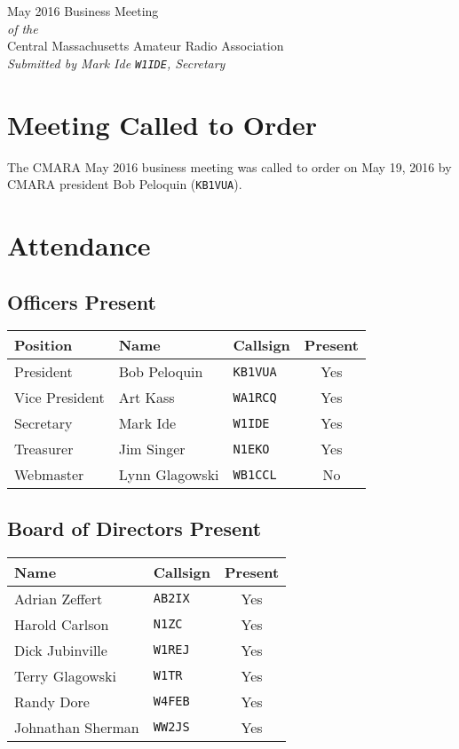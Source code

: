 \documentclass[10pt,letterpaper]{article}
\begin{document}
\begin{center}
{\huge May 2016 Business Meeting}\\
\emph{of the}\\
{\Large Central Massachusetts Amateur Radio Association}\\
\emph{Submitted by Mark Ide \texttt{W1IDE}, Secretary}
\end{center}

\section{Meeting Called to Order}
The CMARA May 2016 business meeting was called to order on May 19, 2016 by CMARA president Bob Peloquin (\texttt{KB1VUA}).

\section{Attendance}

\subsection{Officers Present}

\begin{tabular}{|l|l|l|c|}
  \hline
  \textbf{Position} & \textbf{Name}  & \textbf{Callsign} & \textbf{Present} \\ \hline
  President         & Bob Peloquin   & \texttt{KB1VUA}   & Yes \\
  Vice President    & Art Kass       & \texttt{WA1RCQ}   & Yes \\
  Secretary         & Mark Ide       & \texttt{W1IDE}    & Yes \\
  Treasurer         & Jim Singer     & \texttt{N1EKO}    & Yes \\
  Webmaster         & Lynn Glagowski & \texttt{WB1CCL}   & No  \\
  \hline
\end{tabular}

\subsection{Board of Directors Present}

\begin{tabular}{|l|l|c|}
  \hline
  \textbf{Name}     & \textbf{Callsign} & \textbf{Present} \\ \hline
  Adrian Zeffert    & \texttt{AB2IX}    & Yes \\
  Harold Carlson    & \texttt{N1ZC}     & Yes \\
  Dick Jubinville   & \texttt{W1REJ}    & Yes \\
  Terry Glagowski   & \texttt{W1TR}     & Yes \\
  Randy Dore        & \texttt{W4FEB}    & Yes \\
  Johnathan Sherman & \texttt{WW2JS}    & Yes \\
  \hline
\end{tabular}
\end{document}
